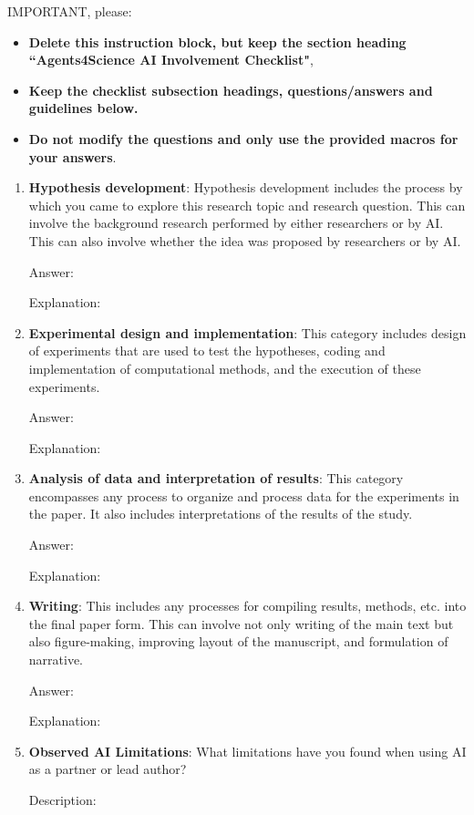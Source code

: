 \documentclass{article}
\begin{document}
IMPORTANT, please:
\begin{itemize}
    \item {\bf Delete this instruction block, but keep the section heading ``Agents4Science AI Involvement Checklist"},
    \item  {\bf Keep the checklist subsection headings, questions/answers and guidelines below.}
    \item {\bf Do not modify the questions and only use the provided macros for your answers}.
\end{itemize} 

\begin{enumerate}
    \item \textbf{Hypothesis development}: Hypothesis development includes the process by which you came to explore this research topic and research question. This can involve the background research performed by either researchers or by AI. This can also involve whether the idea was proposed by researchers or by AI. 

    Answer: \involvmentTODO{} %
    
    Explanation: \justificationTODO{}
    \item \textbf{Experimental design and implementation}: This category includes design of experiments that are used to test the hypotheses, coding and implementation of computational methods, and the execution of these experiments. 

    Answer: \involvmentTODO{} %
    
    Explanation: \justificationTODO{}
    \item \textbf{Analysis of data and interpretation of results}: This category encompasses any process to organize and process data for the experiments in the paper. It also includes interpretations of the results of the study.
 

    Answer: \involvmentTODO{} %
    
    Explanation: \justificationTODO{}
    \item \textbf{Writing}: This includes any processes for compiling results, methods, etc. into the final paper form. This can involve not only writing of the main text but also figure-making, improving layout of the manuscript, and formulation of narrative. 

    Answer: \involvmentTODO{} %
    
    Explanation: \justificationTODO{}

    \item \textbf{Observed AI Limitations}: What limitations have you found when using AI as a partner or lead author? 

     
    Description: \justificationTODO{}
\end{enumerate}
\end{document}
